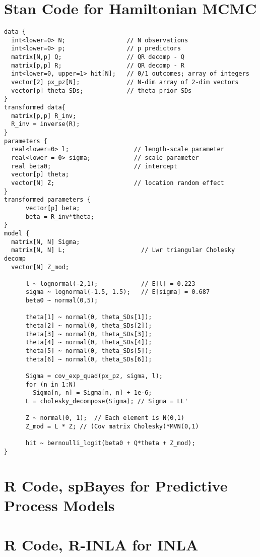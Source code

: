 \documentclass{article}
\begin{document}
\section{Stan Code for Hamiltonian MCMC} %
\begin{verbatim}
data {                             
  int<lower=0> N;                 // N observations
  int<lower=0> p;                 // p predictors
  matrix[N,p] Q;                  // QR decomp - Q
  matrix[p,p] R;                  // QR decomp - R
  int<lower=0, upper=1> hit[N];   // 0/1 outcomes; array of integers
  vector[2] px_pz[N];             // N-dim array of 2-dim vectors
  vector[p] theta_SDs;            // theta prior SDs
}
transformed data{
  matrix[p,p] R_inv;
  R_inv = inverse(R);
}
parameters {                
  real<lower=0> l;                  // length-scale parameter
  real<lower = 0> sigma;            // scale parameter
  real beta0;                       // intercept 
  vector[p] theta;
  vector[N] Z;                      // location random effect
}
transformed parameters {
      vector[p] beta;
      beta = R_inv*theta;
}
model {  
  matrix[N, N] Sigma;
  matrix[N, N] L;                     // Lwr triangular Cholesky decomp
  vector[N] Z_mod;
      
      l ~ lognormal(-2,1);            // E[l] = 0.223
      sigma ~ lognormal(-1.5, 1.5);   // E[sigma] = 0.687
      beta0 ~ normal(0,5);
      
      theta[1] ~ normal(0, theta_SDs[1]);
      theta[2] ~ normal(0, theta_SDs[2]);
      theta[3] ~ normal(0, theta_SDs[3]);
      theta[4] ~ normal(0, theta_SDs[4]);
      theta[5] ~ normal(0, theta_SDs[5]);
      theta[6] ~ normal(0, theta_SDs[6]);
      
      Sigma = cov_exp_quad(px_pz, sigma, l); 
      for (n in 1:N)
        Sigma[n, n] = Sigma[n, n] + 1e-6;
      L = cholesky_decompose(Sigma); // Sigma = LL' 
      
      Z ~ normal(0, 1);  // Each element is N(0,1)
      Z_mod = L * Z; // (Cov matrix Cholesky)*MVN(0,1)
      
      hit ~ bernoulli_logit(beta0 + Q*theta + Z_mod);
}
\end{verbatim}

\section{R Code, spBayes for Predictive Process Models} %

\section{R Code, R-INLA for INLA}
\end{document}
